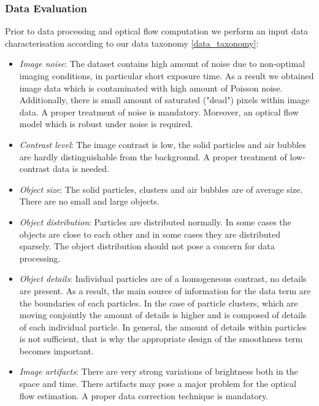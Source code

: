 \subsubsection{Data Evaluation}


Prior to data processing and optical flow computation we perform an input data characterisation according to our data taxonomy \ref{data_taxonomy}:

\begin{itemize}
	\item \textit{Image noise}: The dataset contains high amount of noise due to non-optimal imaging conditions, in particular short exposure time. As a result we obtained image data which is contaminated with high amount of Poisson noise. Additionally, there is small amount of saturated ("dead") pixels within image data. A proper treatment of noise is mandatory. Moreover, an optical flow model which is robust under noise is required.
	
	\item \textit{Contrast level}:  The image contrast is low, the solid particles and air bubbles are hardly distinguishable from the background. A proper treatment of low-contrast data is needed.
	
	\item \textit{Object size}: The solid particles, clusters and air bubbles are of average size.  There are no small and large objects.
	
	\item \textit{Object distribution}: Particles are distributed normally. In some cases the objects are close to each other and in some cases they are distributed sparsely. The object distribution should not pose a concern for data processing. 
	
	\item \textit{Object details}: Individual particles are of a homogeneous contrast, no details are present. As a result, the main source of information for the data term are the boundaries of each particles. In the case of particle clusters, which are moving conjointly the amount of details is higher and is composed of details of each individual particle. In general, the amount of details within particles is not sufficient, that is why the appropriate design of the smoothness term becomes important.
	
	\item \textit{Image artifacts}: There are very strong variations of brightness both in the space and time. There artifacts may pose a major problem for the optical flow estimation. A proper data correction technique is mandatory.
	

\end{itemize}
